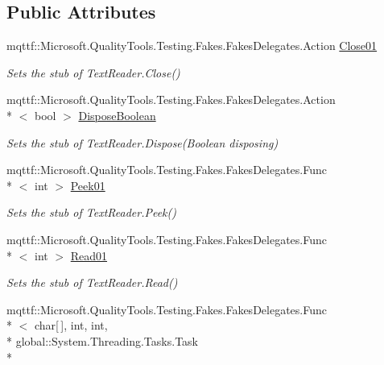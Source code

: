\subsection*{Public Attributes}
\begin{DoxyCompactItemize}
\item 
mqttf\-::\-Microsoft.\-Quality\-Tools.\-Testing.\-Fakes.\-Fakes\-Delegates.\-Action \hyperlink{class_system_1_1_i_o_1_1_fakes_1_1_stub_text_reader_a839b26d9bbedf7d94373994a5c470fc6}{Close01}
\begin{DoxyCompactList}\small\item\em Sets the stub of Text\-Reader.\-Close()\end{DoxyCompactList}\item 
mqttf\-::\-Microsoft.\-Quality\-Tools.\-Testing.\-Fakes.\-Fakes\-Delegates.\-Action\\*
$<$ bool $>$ \hyperlink{class_system_1_1_i_o_1_1_fakes_1_1_stub_text_reader_a158031f3cd3cd0235644c21f827f78b5}{Dispose\-Boolean}
\begin{DoxyCompactList}\small\item\em Sets the stub of Text\-Reader.\-Dispose(\-Boolean disposing)\end{DoxyCompactList}\item 
mqttf\-::\-Microsoft.\-Quality\-Tools.\-Testing.\-Fakes.\-Fakes\-Delegates.\-Func\\*
$<$ int $>$ \hyperlink{class_system_1_1_i_o_1_1_fakes_1_1_stub_text_reader_a19bd5f4645dcbf37547436c26f27138a}{Peek01}
\begin{DoxyCompactList}\small\item\em Sets the stub of Text\-Reader.\-Peek()\end{DoxyCompactList}\item 
mqttf\-::\-Microsoft.\-Quality\-Tools.\-Testing.\-Fakes.\-Fakes\-Delegates.\-Func\\*
$<$ int $>$ \hyperlink{class_system_1_1_i_o_1_1_fakes_1_1_stub_text_reader_a0df0e5cb6ee215ccfc04c37e8b7d9165}{Read01}
\begin{DoxyCompactList}\small\item\em Sets the stub of Text\-Reader.\-Read()\end{DoxyCompactList}\item 
mqttf\-::\-Microsoft.\-Quality\-Tools.\-Testing.\-Fakes.\-Fakes\-Delegates.\-Func\\*
$<$ char\mbox{[}$\,$\mbox{]}, int, int, \\*
global\-::\-System.\-Threading.\-Tasks.\-Task\\*

\end{DoxyCompactItemize}

